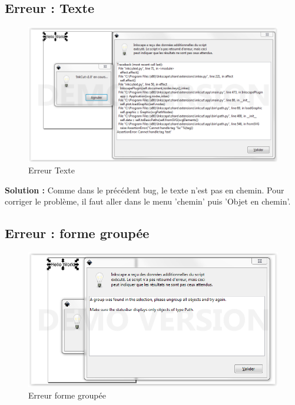 \documentclass[a4paper,oneside,12pt]{report}
\begin{document}
\subsection{Erreur : Texte}
\begin{figure}[h]
 \begin{center}
  \includegraphics[width=15cm]{imgs/inkcutErrorText.png}
  \caption{ Erreur Texte  }
 \end{center}
\end{figure}

\textbf{Solution :} Comme dans le précédent bug, le texte n'est pas en chemin. Pour corriger le problème, il faut aller dans le menu 'chemin'
puis 'Objet en chemin'.
\newpage


\subsection{Erreur : forme groupée}
\begin{figure}[h]
 \begin{center}
  \includegraphics[width=15cm]{imgs/inkcutErrorGroup.png}
  \caption{ Erreur forme groupée }
 \end{center}
\end{figure}
\end{document}
